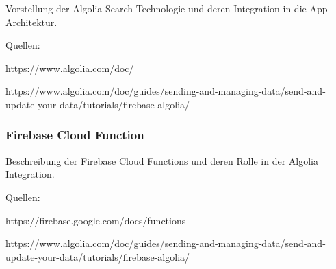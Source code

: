 Vorstellung der Algolia Search Technologie und deren Integration in die App-Architektur.

Quellen: 

https://www.algolia.com/doc/ 

https://www.algolia.com/doc/guides/sending-and-managing-data/send-and-update-your-data/tutorials/firebase-algolia/

\subsubsection{Firebase Cloud Function}

Beschreibung der Firebase Cloud Functions und deren Rolle in der Algolia Integration.

Quellen: 

https://firebase.google.com/docs/functions

https://www.algolia.com/doc/guides/sending-and-managing-data/send-and-update-your-data/tutorials/firebase-algolia/
